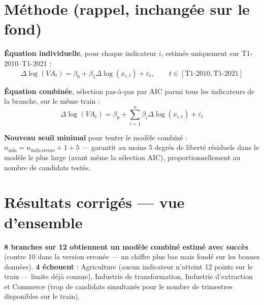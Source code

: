 \documentclass[11pt,a4paper]{article}
\begin{document}
\section{Méthode (rappel, inchangée sur le fond)}

\textbf{Équation individuelle}, pour chaque indicateur $i$, estimée uniquement sur T1-2010--T1-2021 :
\begin{equation}
\Delta\log(VA_t) = \beta_0 + \beta_1 \Delta\log(x_{i,t}) + \varepsilon_t, \qquad t \in [\text{T1-2010}, \text{T1-2021}]
\label{eq:bridge_simple}
\end{equation}

\textbf{Équation combinée}, sélection pas-à-pas par AIC parmi tous les indicateurs de la branche, sur le même train :
\begin{equation}
\Delta\log(VA_t) = \beta_0 + \sum_{i=1}^{n}\beta_i \Delta\log(x_{i,t}) + \varepsilon_t
\label{eq:bridge_combinee}
\end{equation}

\begin{definitionbox}
\textbf{Nouveau seuil minimal} pour tenter le modèle combiné : $n_{\min} = n_{\text{indicateurs}} + 1 + 5$ --- garantit au moins 5 degrés de liberté résiduels dans le modèle le plus large (avant même la sélection AIC), proportionnellement au nombre de candidats testés.
\end{definitionbox}

\section{Résultats corrigés --- vue d'ensemble}

\begin{resultatbox}
\textbf{8 branches sur 12 obtiennent un modèle combiné estimé avec succès} (contre 10 dans la version erronée --- un chiffre plus bas mais fondé sur les bonnes données). \textbf{4 échouent} : Agriculture (aucun indicateur n'atteint 12 points sur le train --- limite déjà connue), Industrie de transformation, Industrie d'extraction et Commerce (trop de candidats simultanés pour le nombre de trimestres disponibles sur le train).
\end{resultatbox}
\end{document}
